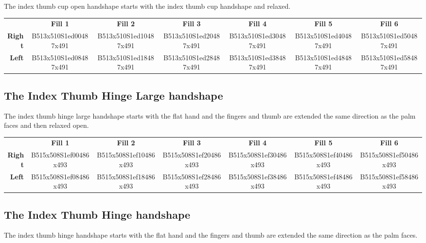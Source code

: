 \documentclass{article}
\begin{document}
The index thumb cup open handshape starts with the index thumb cup handshape and relaxed.

\begin{center}
\begin{tabular}{r*{6}{c}}
&\textbf{Fill 1}&\textbf{Fill 2}&\textbf{Fill 3}&\textbf{Fill 4}&\textbf{Fill 5}&\textbf{Fill 6}\\
\textbf{Right}&
B513x510S1ed00487x491&
B513x510S1ed10487x491&
B513x510S1ed20487x491&
B513x510S1ed30487x491&
B513x510S1ed40487x491&
B513x510S1ed50487x491\\
\textbf{Left}&
B513x510S1ed08487x491&
B513x510S1ed18487x491&
B513x510S1ed28487x491&
B513x510S1ed38487x491&
B513x510S1ed48487x491&
B513x510S1ed58487x491\\
\end{tabular}
\end{center}

\subsection{The Index Thumb Hinge Large handshape}

The index thumb hinge large handshape starts with the flat hand and the fingers and thumb are extended the same direction as the palm faces and then relaxed open.

\begin{center}
\begin{tabular}{r*{6}{c}}
&\textbf{Fill 1}&\textbf{Fill 2}&\textbf{Fill 3}&\textbf{Fill 4}&\textbf{Fill 5}&\textbf{Fill 6}\\
\textbf{Right}&
B515x508S1ef00486x493&
B515x508S1ef10486x493&
B515x508S1ef20486x493&
B515x508S1ef30486x493&
B515x508S1ef40486x493&
B515x508S1ef50486x493\\
\textbf{Left}&
B515x508S1ef08486x493&
B515x508S1ef18486x493&
B515x508S1ef28486x493&
B515x508S1ef38486x493&
B515x508S1ef48486x493&
B515x508S1ef58486x493\\
\end{tabular}
\end{center}

\subsection{The Index Thumb Hinge handshape}

The index thumb hinge handshape starts with the flat hand and the fingers and thumb are extended the same direction as the palm faces.
\end{document}
